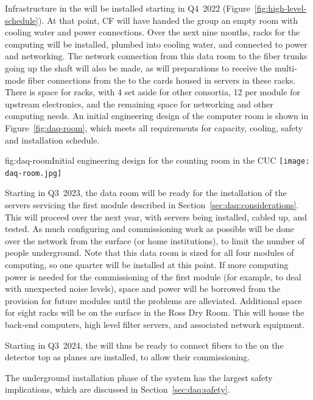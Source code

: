 Infrastructure in the  will be installed starting in Q4~2022
(Figure~\ref{fig:high-level-schedule}).  At that point, CF will have
handed the  group an empty room with cooling water and power
connections.  Over the next nine months, racks for the  computing
will be installed, plumbed into cooling water, and connected to power
and networking.  The network connection from this data room to the fiber
trunks going up the shaft will also be made, as will preparations to
receive the multi-mode fiber connections from the  to the
 cards housed in servers in these racks. There is space
for \cucracks racks, with 4 set aside for other consortia, 12 per
module for upstream  electronics, and the remaining space for
networking and other  computing needs. An initial engineering design of the computer room is shown in Figure~\ref{fig:daq-room}, which meets all requirements for capacity, cooling, safety and installation schedule.

\begin{dunefigure}{fig:daq-room}{Initial engineering design for the  counting room in the CUC}
 \texttt{[image: daq-room.jpg]}
\end{dunefigure}

Starting in Q3~2023, the data room will be ready for the installation of
the  servers servicing the first module described in
Section~\ref{sec:daq:considerations}.  This will proceed over the
next year, with servers being installed, cabled up, and tested.
As much configuring and commissioning work as possible will be done over
the network from the surface (or home institutions), to limit the number
of people underground.  Note that this data room is sized for all four
modules of  computing, so one quarter will be installed at this
point.  If more computing power is needed for the commissioning of the
first module (for example, to deal with unexpected noise levels), space
and power will be borrowed from the provision for future modules until the problems are
alleviated. 
Additional space for eight racks will be on the surface in the Ross Dry
Room. This will house the back-end computers, high level filter servers, and associated network equipment.

Starting in Q3~2024, the  will thus be ready to connect fibers to the
 on the detector top as planes are installed, to allow their commissioning.

The underground installation phase of the  system has the largest safety
implications, which are discussed in Section~\ref{sec:daq:safety}.

